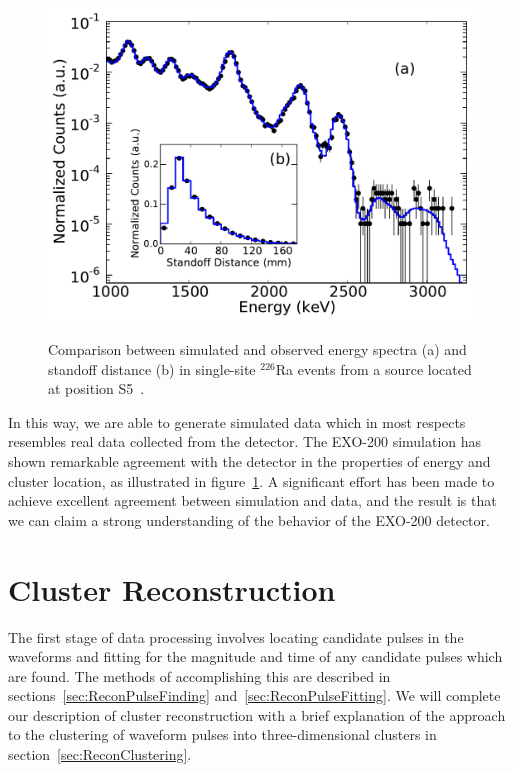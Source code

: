 \begin{figure}
\begin{center}
\includegraphics[keepaspectratio=true,width=\textwidth]{SS_Ra226_Campaign7.pdf}
\end{center}
\renewcommand{\baselinestretch}{1}
\small\normalsize
\begin{quote}
\caption{Comparison between simulated and observed energy spectra (a) and standoff distance (b) in single-site $^{226}$Ra events from a source located at position S5~\cite{NewEXObb0nPaper_2014}.}
\label{fig:RaSourceMCComparison}
\end{quote}
\end{figure}
\renewcommand{\baselinestretch}{2}
\small\normalsize

In this way, we are able to generate simulated data which in most respects resembles real data collected from the detector.  The EXO-200 simulation has shown remarkable agreement with the detector in the properties of energy and cluster location, as illustrated in figure~\ref{fig:RaSourceMCComparison}.  A significant effort has been made to achieve excellent agreement between simulation and data, and the result is that we can claim a strong understanding of the behavior of the EXO-200 detector.

\section{Cluster Reconstruction}\label{sec:ResultReconstruction}

The first stage of data processing involves locating candidate pulses in the waveforms and fitting for the magnitude and time of any candidate pulses which are found.  The methods of accomplishing this are described in sections~\ref{sec:ReconPulseFinding} and~\ref{sec:ReconPulseFitting}.  We will complete our description of cluster reconstruction with a brief explanation of the approach to the clustering of waveform pulses into three-dimensional clusters in section~\ref{sec:ReconClustering}.

